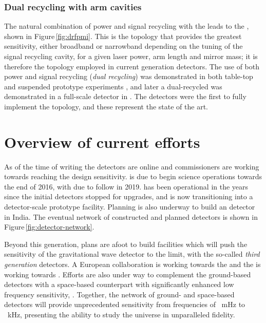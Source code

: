 \subsubsection{Dual recycling with \FP{} arm cavities}
The natural combination of power and signal recycling with the \FPMI{} leads to the \emph{\DRFPMI{}}, shown in Figure\,\ref{fig:drfpmi}. This is the topology that provides the greatest sensitivity, either broadband or narrowband depending on the tuning of the signal recycling cavity, for a given laser power, arm length and mirror mass; it is therefore the topology employed in current generation detectors. The use of both power and signal recycling (\emph{dual recycling}) was demonstrated in both table-top and suspended prototype experiments \cite{Strain1991, Heinzel1998, Freise2000}, and later a dual-recycled \MI{} was demonstrated in a full-scale detector in \GEO{} \cite{Heinzel2002, Grote2004}. The \ALIGO{} detectors were the first to fully implement the \DRFPMI{} topology, and these represent the state of the art.

\section{Overview of current efforts}
As of the time of writing the \ALIGO{} detectors are online and commissioners are working towards reaching the design sensitivity. \AVIRGO{} is due to begin science operations towards the end of 2016, with \KAGRA{} due to follow in 2019. \GEOHF{} has been operational in the years since the initial detectors stopped for upgrades, and is now transitioning into a detector-scale prototype facility. Planning is also underway to build an \ALIGO{} detector in India. The eventual network of constructed and planned detectors is shown in Figure\,\ref{fig:detector-network}.

Beyond this generation, plans are afoot to build facilities which will push the sensitivity of the gravitational wave detector to the limit, with the so-called \emph{third generation} detectors. A European collaboration is working towards the \emph{\ET{}} and the \LSC{} is working towards \emph{\LIGOCE{}}. Efforts are also under way to complement the ground-based detectors with a space-based counterpart with significantly enhanced low frequency sensitivity, \emph{\ELISA{}}. Together, the network of ground- and space-based detectors will provide unprecedented sensitivity from frequencies of \SI{}{\milli\hertz} to \SI{}{\kilo\hertz}, presenting the ability to study the universe in unparalleled fidelity.

